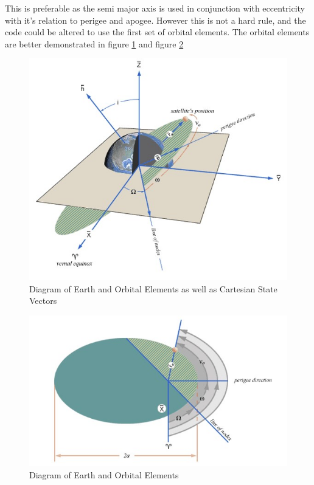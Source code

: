 \documentclass[12pt]{report}
\begin{document}
	This is preferable as the semi major axis is used in conjunction with eccentricity with it's relation to perigee and apogee.  However this is not a hard rule, and the code could be altered to use the first set of orbital elements. The orbital elements are better demonstrated in figure \ref{fig:nasaoe1} and figure \ref{fig:nasaoe2}
	
	\begin{figure}
		\centering
		\includegraphics[width=0.7\linewidth]{nasaOE1}
		\caption{Diagram of Earth and Orbital Elements as well as Cartesian State Vectors\cite{nasaOE}}
		\label{fig:nasaoe1}
	\end{figure}
	\begin{figure}
		\centering
		\includegraphics[width=0.7\linewidth]{nasaOE2}
		\caption{Diagram of Earth and Orbital Elements\cite{nasaOE}}
		\label{fig:nasaoe2}
	\end{figure}
	
	
\end{document}
